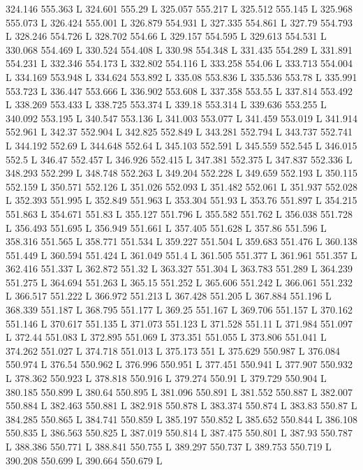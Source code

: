 324.146 555.363 L
324.601 555.29 L
325.057 555.217 L
325.512 555.145 L
325.968 555.073 L
326.424 555.001 L
326.879 554.931 L
327.335 554.861 L
327.79 554.793 L
328.246 554.726 L
328.702 554.66 L
329.157 554.595 L
329.613 554.531 L
330.068 554.469 L
330.524 554.408 L
330.98 554.348 L
331.435 554.289 L
331.891 554.231 L
332.346 554.173 L
332.802 554.116 L
333.258 554.06 L
333.713 554.004 L
334.169 553.948 L
334.624 553.892 L
335.08 553.836 L
335.536 553.78 L
335.991 553.723 L
336.447 553.666 L
336.902 553.608 L
337.358 553.55 L
337.814 553.492 L
338.269 553.433 L
338.725 553.374 L
339.18 553.314 L
339.636 553.255 L
340.092 553.195 L
340.547 553.136 L
341.003 553.077 L
341.459 553.019 L
341.914 552.961 L
342.37 552.904 L
342.825 552.849 L
343.281 552.794 L
343.737 552.741 L
344.192 552.69 L
344.648 552.64 L
345.103 552.591 L
345.559 552.545 L
346.015 552.5 L
346.47 552.457 L
346.926 552.415 L
347.381 552.375 L
347.837 552.336 L
348.293 552.299 L
348.748 552.263 L
349.204 552.228 L
349.659 552.193 L
350.115 552.159 L
350.571 552.126 L
351.026 552.093 L
351.482 552.061 L
351.937 552.028 L
352.393 551.995 L
352.849 551.963 L
353.304 551.93 L
353.76 551.897 L
354.215 551.863 L
354.671 551.83 L
355.127 551.796 L
355.582 551.762 L
356.038 551.728 L
356.493 551.695 L
356.949 551.661 L
357.405 551.628 L
357.86 551.596 L
358.316 551.565 L
358.771 551.534 L
359.227 551.504 L
359.683 551.476 L
360.138 551.449 L
360.594 551.424 L
361.049 551.4 L
361.505 551.377 L
361.961 551.357 L
362.416 551.337 L
362.872 551.32 L
363.327 551.304 L
363.783 551.289 L
364.239 551.275 L
364.694 551.263 L
365.15 551.252 L
365.606 551.242 L
366.061 551.232 L
366.517 551.222 L
366.972 551.213 L
367.428 551.205 L
367.884 551.196 L
368.339 551.187 L
368.795 551.177 L
369.25 551.167 L
369.706 551.157 L
370.162 551.146 L
370.617 551.135 L
371.073 551.123 L
371.528 551.11 L
371.984 551.097 L
372.44 551.083 L
372.895 551.069 L
373.351 551.055 L
373.806 551.041 L
374.262 551.027 L
374.718 551.013 L
375.173 551 L
375.629 550.987 L
376.084 550.974 L
376.54 550.962 L
376.996 550.951 L
377.451 550.941 L
377.907 550.932 L
378.362 550.923 L
378.818 550.916 L
379.274 550.91 L
379.729 550.904 L
380.185 550.899 L
380.64 550.895 L
381.096 550.891 L
381.552 550.887 L
382.007 550.884 L
382.463 550.881 L
382.918 550.878 L
383.374 550.874 L
383.83 550.87 L
384.285 550.865 L
384.741 550.859 L
385.197 550.852 L
385.652 550.844 L
386.108 550.835 L
386.563 550.825 L
387.019 550.814 L
387.475 550.801 L
387.93 550.787 L
388.386 550.771 L
388.841 550.755 L
389.297 550.737 L
389.753 550.719 L
390.208 550.699 L
390.664 550.679 L
